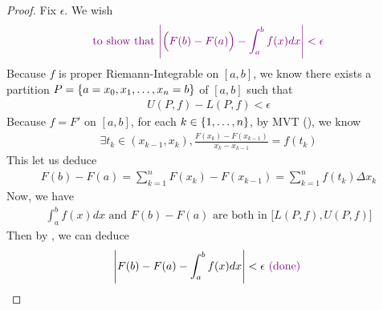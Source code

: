\documentclass{report}
\begin{document}
\begin{proof}
Fix $\epsilon $. We wish 
\begin{align*}
\textcolor{violet}{\text{ to show that $\left|\Big( F(b)-F(a)\Big)-\int_a^b f(x)dx\right|<\epsilon $ }}
\end{align*}
Because $f$ is proper Riemann-Integrable on $[a,b]$, we know there exists a partition $P=\{ a=x_0,x_1,\dots , x_n=b \}$ of  $[a,b]$ such that 
\begin{align}
\label{FP}
U(P,f)-L(P,f)<\epsilon 
\end{align}
Because $f=F'$ on  $[a,b]$, for each $k \in \{ 1,\dots ,n \}$, by MVT (), we know 
\begin{align*}
\exists t_k \in (x_{k-1},x_k), \frac{F(x_k)-F(x_{k-1})}{x_k-x_{k-1}}=f(t_k)
\end{align*}
This let us deduce
\begin{align*}
F(b)-F(a)=\sum_{k=1}^n F(x_k)-F(x_{k-1})=\sum_{k=1}^n f(t_k) \Delta x_k
\end{align*}
Now, we have 
\begin{align*}
  \int_a^b f(x)dx\text{ and }F(b)-F(a)\text{ are both in }\big[ L(P,f),U(P,f) \big]
\end{align*}
Then by , we can deduce 
\begin{align*}
\left|F(b)-F(a)- \int_a^b f(x)dx\right|<\epsilon \textcolor{violet}{\text{ (done) }}
\end{align*}




\end{proof}
\end{document}

